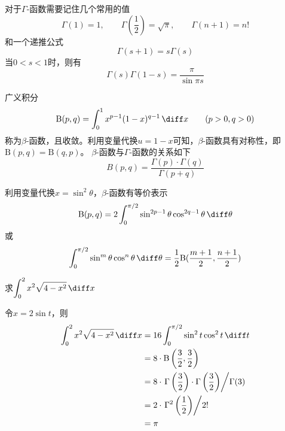 对于$\Gamma$-函数需要记住几个常用的值
\[ \Gamma(1)=1,\qquad \Gamma\left(\frac{1}{2}\right)=\sqrt{\pi},\qquad\Gamma(n+1)=n! \]
和一个递推公式
\[ \Gamma(s+1) = s\Gamma(s) \]
当$0<s<1$时，则有
\[ \Gamma(s)\Gamma(1-s) = \frac{\pi}{\sin \pi s} \]

广义积分
\[ \mathrm{B}(p,q) = \int_0^1 x^{p-1}(1-x)^{q-1}\,\diff x \qquad (p>0,q>0) \]
称为$\beta$-函数，且收敛。利用变量代换$u=1-x$可知，$\beta$-函数具有对称性，即$\mathrm{B}(p,q)=\mathrm{B}(q,p)$。
$\beta$-函数与$\Gamma$-函数的关系如下
\[ B(p,q) = \frac{\Gamma(p)\cdot\Gamma(q)}{\Gamma(p+q)} \]

利用变量代换$x=\sin^2\theta$，$\beta$-函数有等价表示
\[ \mathrm{B}(p,q) = 2\int_0^{\pi/2}\sin^{2p-1}\theta\cos^{2q-1}\theta\,\diff\theta \]
或
\[ \int_0^{\pi/2} \sin^m\theta\cos^n\theta\,\diff\theta = \frac{1}{2}\mathrm{B}(\frac{m+1}{2},\frac{n+1}{2}) \]

\begin{example}
    求$\displaystyle\int_0^2x^2\sqrt{4-x^2}\,\diff x$
\end{example}
\begin{solution}
    令$x=2\sin t$，则
    \begin{align*}
        \int_0^2x^2\sqrt{4-x^2}\,\diff x & = 16\int_0^{\pi/2} \sin^2 t\cos^2 t\,\diff t                                                              \\
                                         & = 8 \cdot \mathrm{B}\left(\frac{3}{2},\frac{3}{2}\right)                                                  \\
                                         & = 8 \cdot \left.\Gamma\left(\frac{3}{2}\right)\cdot\Gamma\left(\frac{3}{2}\right)\middle/\Gamma(3)\right. \\
                                         & = 2 \cdot \left.\Gamma^2\left(\frac{1}{2}\right)\middle/ 2!\right.                                        \\
                                         & = \pi
    \end{align*}
\end{solution}

